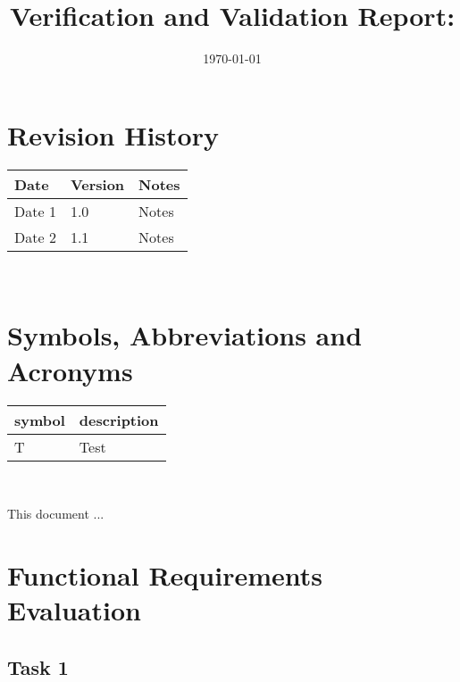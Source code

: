 \documentclass[12pt, titlepage]{article}
\begin{document}
\title{Verification and Validation Report: \progname} 
\author{\authname}
\date{\today}
	
\maketitle


\section{Revision History}

\begin{tabularx}{\textwidth}{p{3cm}p{2cm}X}
\toprule {\bf Date} & {\bf Version} & {\bf Notes}\\
\midrule
Date 1 & 1.0 & Notes\\
Date 2 & 1.1 & Notes\\
\bottomrule
\end{tabularx}

~\newpage

\section{Symbols, Abbreviations and Acronyms}

\renewcommand{\arraystretch}{1.2}
\begin{tabular}{l l} 
  \toprule		
  \textbf{symbol} & \textbf{description}\\
  \midrule 
  T & Test\\
  \bottomrule
\end{tabular}\\


\newpage

\tableofcontents

\listoftables %

\listoffigures %

\newpage


This document ...

\section{Functional Requirements Evaluation}
\subsection{Task 1}
\end{document}

